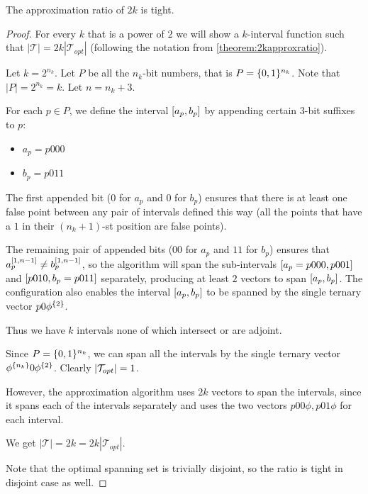 \begin{theorem}
\label{theorem:2kapproxtight}
The approximation ratio of $2k$ is tight.
\end{theorem}

\begin{proof}
For every $k$ that is a power of $2$
we will show a $k$-interval function such that
$|\mathcal{T}| = 2k |\mathcal{T}_{opt}|$
(following the notation from
\autoref{theorem:2kapproxratio}).

Let $k = 2^{n_k}$.
Let $P$ be all the $n_k$-bit numbers,
that is $P = \{0, 1\}^{n_k}$.
Note that $|P| = 2^{n_k} = k$.
Let $n = n_k + 3$.

For each $p \in P$,
we define the interval $[a_p, b_p]$
by appending certain $3$-bit suffixes to $p$:

\begin{itemize}
\item $a_p = p 000$
\item $b_p = p 011$
\end{itemize}

The first appended bit
($0$ for $a_p$ and $0$ for $b_p$)
ensures that there is at least one false point
between any pair of intervals defined this way
(all the points that have a $1$ in their $(n_k + 1)$-st
position are false points).

The remaining pair of appended bits
($00$ for $a_p$ and $11$ for $b_p$)
ensures that
$a_p^{[1, n-1]} \neq b_p^{[1, n-1]}$,
so the algorithm will span the sub-intervals
$[a_p = p 000, p 001]$
and $[p 010, b_p = p 011]$ separately,
producing at least $2$ vectors to span
$[a_p, b_p]$.
The configuration also enables
the interval $[a_p, b_p]$
to be spanned by the single ternary vector
$p 0 \phi^{\{2\}}$.

Thus we have $k$ intervals
none of which intersect or are adjoint.

Since $P = \{0, 1\}^{n_k}$,
we can span all the intervals by the single ternary vector
$\phi^{\{n_k\}} 0 \phi^{\{2\}}$.
Clearly $\lvert\mathcal{T}_{opt}\rvert = 1$.

However,
the approximation algorithm uses $2k$ vectors to span
the intervals,
since it spans each of the intervals separately
and uses the two vectors
$p 0 0 \phi, p 0 1 \phi$
for each interval.

We get
$|\mathcal{T}| = 2k = 2k |\mathcal{T}_{opt}|$.

Note that the optimal spanning set is trivially disjoint,
so the ratio is tight in disjoint case as well.
\end{proof}
